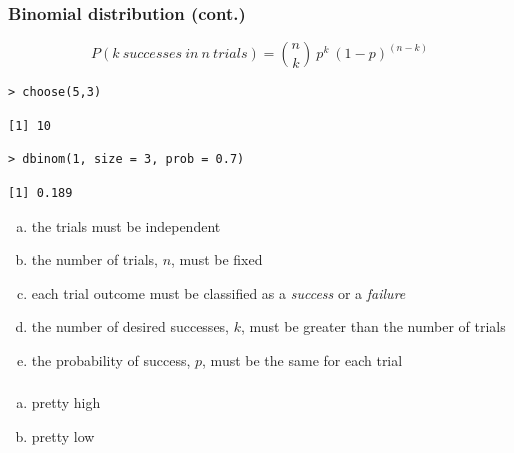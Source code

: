 \documentclass[11pt,containsverbatim,handout,xcolor=xelatex,dvipsnames,table]{beamer}
\newcommand{\solnMult}[1]{#1}
\begin{document}

\begin{frame}[fragile]
\frametitle{Binomial distribution (cont.)}

\[P(k~successes~in~n~trials) = {n \choose k}~p^k~(1-p)^{(n-k)} \] 

\pause

{\footnotesize
\begin{Verbatim}[frame=single, formatcom=\color{blue}]
> choose(5,3)
\end{Verbatim}
}
{\footnotesize
\begin{Verbatim}[frame=single, formatcom=\color{gray}]
[1] 10
\end{Verbatim}
}
\pause
{}
{\footnotesize
\begin{Verbatim}[frame=single, formatcom=\color{blue}]
> dbinom(1, size = 3, prob = 0.7)
\end{Verbatim}
}
{\footnotesize
\begin{Verbatim}[frame=single, formatcom=\color{gray}]
[1] 0.189
\end{Verbatim}
}

\end{frame}


\begin{frame}


\begin{enumerate}[(a)]
\item the trials must be independent
\item the number of trials, $n$, must be fixed
\item each trial outcome must be classified as a \textit{success} or a \textit{failure}
\item \solnMult{the number of desired successes, $k$, must be greater than the number of trials}
\item the probability of success, $p$, must be the same for each trial
\end{enumerate}

\end{frame}


\begin{frame}
\frametitle{}


\begin{enumerate}[(a)]
\item pretty high
\item \solnMult{pretty low}
\end{enumerate}

\end{frame}
\end{document}
